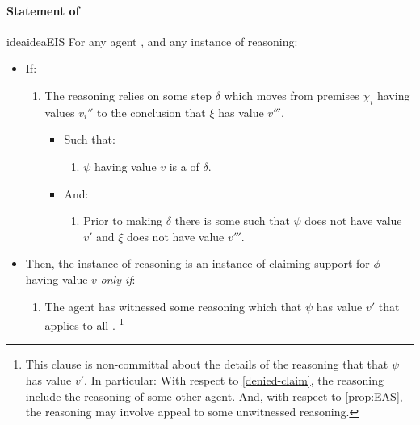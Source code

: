 \paragraph{Statement of \ideaCSB{}}

\begin{note}
  \begin{restatable}{idea}{ideaEIS}
    \label{idea:CS:B}
    For any agent \vAgent{}, and any instance of reasoning:
    \begin{itemize}[leftmargin=*]
    \item
      If:
      \begin{enumerate}[label=\arabic*., ref=(\arabic*)]
      \item
        \label{idea:CS:B:step}
        The reasoning relies on some step \(\delta\) which moves from premises \(\chi_{i}\) having values \(v_{i}''\) to the conclusion that \(\xi\) has value \(v'''\).
        \begin{itemize}
        \item
          Such that:
          \begin{enumerate}[label=\alph*., ref=(\alph*)]
          \item
            \label{idea:CS:B:step:requ}
            \(\psi\) having value \(v\) is a \requ{} of \(\delta\).
          \end{enumerate}
        \item
          And:
          \begin{enumerate}[label=\alph*., ref=(\alph*), resume]
          \item
            \label{idea:CS:B:step:psi-ep}
            Prior to making \(\delta\) there is some \epPAd{} \world{} such that \(\psi\) does not have value \(v'\) and \(\xi\) does not have value \(v'''\).
          \end{enumerate}
        \end{itemize}
      \end{enumerate}
    \item
      Then, the instance of reasoning is an instance of claiming support for \(\phi\) having value \(v\) \emph{only if}:
      \begin{enumerate}[label=\arabic*., ref=(\arabic*), resume]
      \item
        \label{idea:CS:B:prior-reasoning}
        The agent has witnessed some reasoning which  that \(\psi\) has value \(v'\) that applies to all \epVAd{} .\nolinebreak
        \footnote{
          This clause is non-committal about the details of the reasoning that  that \(\psi\) has value \(v'\).
          In particular:
          With respect to \autoref{denied-claim}, the reasoning include the reasoning of some other agent.
          And, with respect to \autoref{prop:EAS}, the reasoning may involve appeal to some unwitnessed reasoning.
        }
      \end{enumerate}
    \end{itemize}
    \vspace{-\baselineskip}
  \end{restatable}
\end{note}

